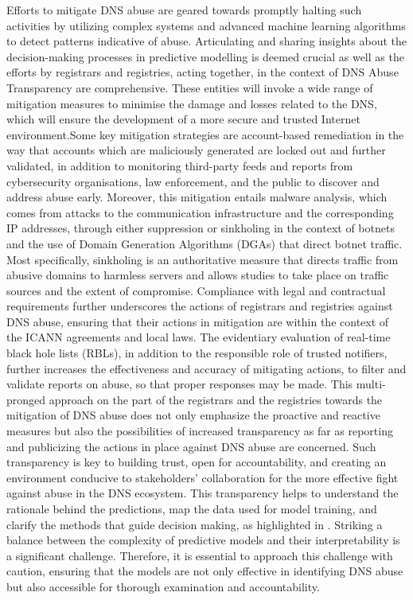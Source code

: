 Efforts to mitigate DNS abuse are geared towards promptly halting such activities by utilizing complex systems and advanced machine learning algorithms to detect patterns indicative of abuse. Articulating and sharing insights about the decision-making processes in predictive modelling is deemed crucial as well as the efforts by registrars and registries, acting together, in the context of DNS Abuse Transparency are comprehensive. These entities will invoke a wide range of mitigation measures to minimise the damage and losses related to the DNS, which will ensure the development of a more secure and trusted Internet environment.Some key mitigation strategies are account-based remediation in the way that accounts which are maliciously generated are locked out and further validated, in addition to monitoring third-party feeds and reports from cybersecurity organisations, law enforcement, and the public to discover and address abuse early. Moreover, this mitigation entails malware analysis, which comes from attacks to the communication infrastructure and the corresponding IP addresses, through either suppression or sinkholing in the context of botnets and the use of Domain Generation Algorithms (DGAs) that direct botnet traffic. \cite{ M3AAWG2024} Most specifically, sinkholing is an authoritative measure that directs traffic from abusive domains to harmless servers and allows studies to take place on traffic sources and the extent of compromise. Compliance with legal and contractual requirements further underscores the actions of registrars and registries against DNS abuse, ensuring that their actions in mitigation are within the context of the ICANN agreements and local laws. The evidentiary evaluation of real-time black hole lists (RBLs), in addition to the responsible role of trusted notifiers, further increases the effectiveness and accuracy of mitigating actions, to filter and validate reports on abuse, so that proper responses may be made. This multi-pronged approach on the part of the registrars and the registries towards the mitigation of DNS abuse does not only emphasize the proactive and reactive measures but also the possibilities of increased transparency as far as reporting and publicizing the actions in place against DNS abuse are concerned. Such transparency is key to building trust, open for accountability, and creating an environment conducive to stakeholders' collaboration for the more effective fight against abuse in the DNS ecosystem. This transparency helps to understand the rationale behind the predictions, map the data used for model training, and clarify the methods that guide decision making, as highlighted in \cite{hussain2022software}. Striking a balance between the complexity of predictive models and their interpretability is a significant challenge. Therefore, it is essential to approach this challenge with caution, ensuring that the models are not only effective in identifying DNS abuse but also accessible for thorough examination and accountability.

